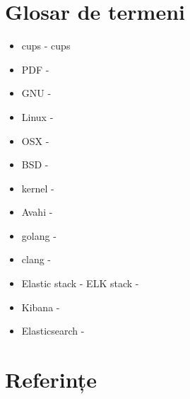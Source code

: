 \documentclass[12pt]{report}
\begin{document}
\chapter{Glosar de termeni}
\begin{itemize}
\item \acrshort{cups} - \acrlong{cups}
\item PDF - 
\item GNU - 
\item Linux -  
\item OSX - 
\item BSD - 
\item kernel - 
\item Avahi - 
\item golang - 
\item clang - 
\item Elastic stack - ELK stack - 
\item Kibana - 
\item Elasticsearch - 
\end{itemize}

\chapter{Referințe}

\clearpage

\printglossaries
\end{document}
